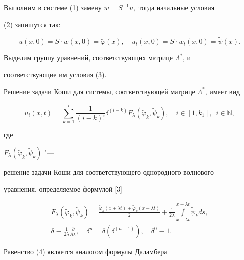 Выполним в системе (1) замену $w=S^{-1}u,$ тогда начальные условия

(2) запишутся так:

\begin{equation}

u(x, 0)=S\cdot w(x, 0)=\widetilde{\varphi}(x),\quad

u_{t}(x,0)=S\cdot w_{t}(x, 0)=\widetilde{\psi}(x).

\end{equation}



Выделим группу уравнений, соответствующих матрице $\Lambda^{*}$, и

соответствующие им условия (3). 

Решение задачи Коши для системы, соответствующей матрице $\Lambda^{*}$, имеет вид

\begin{equation}

u_{i}(x, t)=\sum\limits_{k=1}^{i}\frac{1}{(i-k)!}\delta^{(i-k)}F_{\lambda}(\widetilde{\varphi}_{k},\widetilde{\psi}_{k}),

\quad

i\in[1, k_{1}],\;\ i\in \mathbb N,

\end{equation}

где

$F_{\lambda}(\widetilde{\varphi}_{k}, \widetilde{\psi}_{k})$ "---

решение задачи Коши для соответствующего однородного волнового

уравнения, определяемое формулой [3]

\begin{gather}

F_{\lambda}(\widetilde{\varphi}_{k}, \widetilde{\psi}_{k})=

\frac{\widetilde{\varphi}_{k}(x+\lambda t)+

\widetilde{\varphi}_{k}(x-\lambda t)}{2}+

\frac{1}{2\lambda}\int\limits_{x-\lambda t}^{x+\lambda t}\widetilde{\psi}_{k}ds,

\\

\delta\equiv\frac{1}{2\lambda}\frac{\partial}{\partial\lambda},\quad  

\delta^{n}=\delta(\delta^{(n-1)}),\quad \delta^{0}\equiv 1.

\end{gather} 

Равенство (4) является аналогом формулы Даламбера

